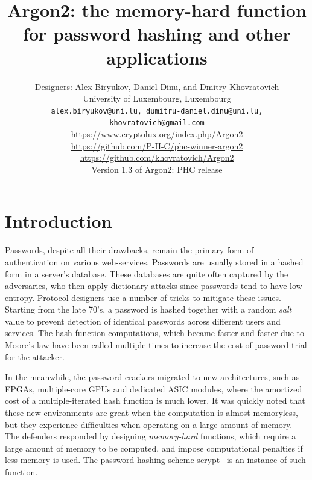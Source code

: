 \documentclass[a4paper]{article}
\begin{document}

\title{\textsf{Argon2: the memory-hard function for password hashing and other applications}}

\author{Designers: Alex Biryukov, Daniel Dinu,  and Dmitry Khovratovich\\University of Luxembourg, Luxembourg
\\[10pt]
{\tt alex.biryukov@uni.lu, dumitru-daniel.dinu@uni.lu, khovratovich@gmail.com}\\[10 pt]
\url{https://www.cryptolux.org/index.php/Argon2}\\
\url{https://github.com/P-H-C/phc-winner-argon2}\\
\url{https://github.com/khovratovich/Argon2}\\[10pt]
Version 1.3 of Argon2: PHC release}

\maketitle

\tableofcontents

\section{Introduction}

Passwords, despite all their drawbacks, remain the primary form of authentication on various web-services. Passwords are usually stored in a hashed form in a server's database. These databases are quite often captured by the adversaries,  who then apply dictionary attacks since passwords tend to have low entropy. Protocol designers use a number of tricks to mitigate these issues. Starting from the late 70's, a password is hashed together with a random \emph{salt} value to prevent detection of identical passwords across different users and services. The hash function computations, which became faster and faster due to Moore's law have been called multiple times to increase the cost of password trial for the attacker.

 In the meanwhile, the password crackers migrated to new architectures, such as FPGAs, multiple-core GPUs and dedicated ASIC modules, where the amortized cost of a multiple-iterated hash function is much lower. It was quickly noted that these new environments are great when the computation is almost memoryless, but they experience difficulties when  operating on a large amount of memory. The defenders responded by designing \emph{memory-hard} functions, which require a large amount of memory to be computed, and impose computational penalties if less memory is used. The password hashing scheme \textsf{scrypt}~\cite{percival2009stronger} is an instance of such function.
\end{document}
